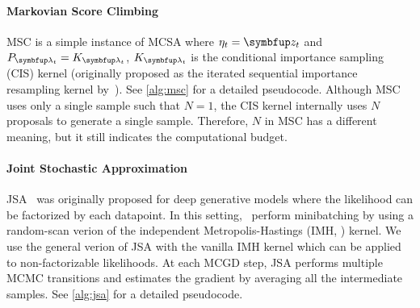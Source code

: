 \vspace{-0.1in}
\paragraph{Markovian Score Climbing}
MSC is a simple instance of MCSA where \(\eta_t = \vz_t\) and \(P_{\vlambda_t} = K_{\vlambda_t}\), \(K_{\vlambda_t}\) is the conditional importance sampling (CIS) kernel (originally proposed as the iterated sequential importance resampling kernel by~\citet{andrieu_uniform_2018}).
See \cref{alg:msc} for a detailed pseudocode.
Although MSC uses only a single sample such that \(N=1\), the CIS kernel internally uses \(N\) proposals to generate a single sample.
Therefore, \(N\) in MSC has a different meaning, but it still indicates the computational budget.




\vspace{-0.1in}
\paragraph{Joint Stochastic Approximation}
JSA~\citep{pmlr-v124-ou20a} was originally proposed for deep generative models where the likelihood can be factorized by each datapoint.
In this setting,~\citeauthor{pmlr-v124-ou20a} perform minibatching by using a random-scan verion of the independent Metropolis-Hastings (IMH, \citealt{hastings_monte_1970,robert_monte_2004}) kernel.
We use the general verion of JSA with the vanilla IMH kernel which can be applied to non-factorizable likelihoods.
At each MCGD step, JSA performs multiple MCMC transitions and estimates the gradient by averaging all the intermediate samples.
See \cref{alg:jsa} for a detailed pseudocode.

\vspace{-0.1in}
